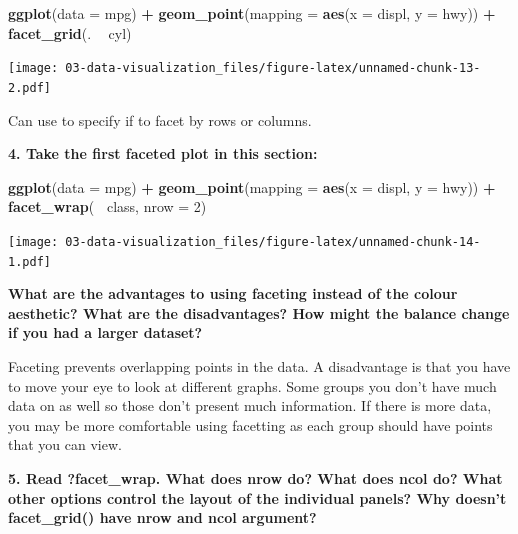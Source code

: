 \documentclass[]{book}
\newenvironment{Shaded}{\begin{snugshade}}{\end{snugshade}}
\newcommand{\DataTypeTok}[1]{\textcolor[rgb]{0.13,0.29,0.53}{#1}}
\newcommand{\DecValTok}[1]{\textcolor[rgb]{0.00,0.00,0.81}{#1}}
\newcommand{\KeywordTok}[1]{\textcolor[rgb]{0.13,0.29,0.53}{\textbf{#1}}}
\newcommand{\NormalTok}[1]{#1}
\newcommand{\OperatorTok}[1]{\textcolor[rgb]{0.81,0.36,0.00}{\textbf{#1}}}
\newcommand{\StringTok}[1]{\textcolor[rgb]{0.31,0.60,0.02}{#1}}
\theoremstyle{definition}
\theoremstyle{definition}
\theoremstyle{definition}
\theoremstyle{remark}
\begin{document}
\begin{Shaded}
\begin{Highlighting}[]
\KeywordTok{ggplot}\NormalTok{(}\DataTypeTok{data =}\NormalTok{ mpg) }\OperatorTok{+}\StringTok{ }
\StringTok{  }\KeywordTok{geom_point}\NormalTok{(}\DataTypeTok{mapping =} \KeywordTok{aes}\NormalTok{(}\DataTypeTok{x =}\NormalTok{ displ, }\DataTypeTok{y =}\NormalTok{ hwy)) }\OperatorTok{+}
\StringTok{  }\KeywordTok{facet_grid}\NormalTok{(. }\OperatorTok{~}\StringTok{ }\NormalTok{cyl)}
\end{Highlighting}
\end{Shaded}

\texttt{[image: 03-data-visualization\_files/figure-latex/unnamed-chunk-13-2.pdf]}

Can use to specify if to facet by rows or columns.

\textbf{4. Take the first faceted plot in this section:}

\begin{Shaded}
\begin{Highlighting}[]
\KeywordTok{ggplot}\NormalTok{(}\DataTypeTok{data =}\NormalTok{ mpg) }\OperatorTok{+}\StringTok{ }
\StringTok{  }\KeywordTok{geom_point}\NormalTok{(}\DataTypeTok{mapping =} \KeywordTok{aes}\NormalTok{(}\DataTypeTok{x =}\NormalTok{ displ, }\DataTypeTok{y =}\NormalTok{ hwy)) }\OperatorTok{+}\StringTok{ }
\StringTok{  }\KeywordTok{facet_wrap}\NormalTok{(}\OperatorTok{~}\StringTok{ }\NormalTok{class, }\DataTypeTok{nrow =} \DecValTok{2}\NormalTok{)}
\end{Highlighting}
\end{Shaded}

\texttt{[image: 03-data-visualization\_files/figure-latex/unnamed-chunk-14-1.pdf]}

\textbf{What are the advantages to using faceting instead of the colour
aesthetic? What are the disadvantages? How might the balance change if
you had a larger dataset?}

Faceting prevents overlapping points in the data. A disadvantage is that
you have to move your eye to look at different graphs. Some groups you
don't have much data on as well so those don't present much information.
If there is more data, you may be more comfortable using facetting as
each group should have points that you can view.

\textbf{5. Read ?facet\_wrap. What does nrow do? What does ncol do? What
other options control the layout of the individual panels? Why doesn't
facet\_grid() have nrow and ncol argument?}
\end{document}
